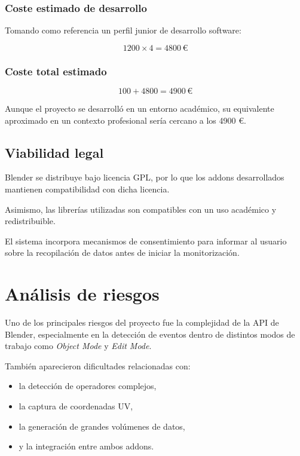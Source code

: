 \subsubsection{Coste estimado de desarrollo}

Tomando como referencia un perfil junior de desarrollo software:

\[
1200 \times 4 = 4800 \,€
\]

\subsubsection{Coste total estimado}

\[
100 + 4800 = 4900 \,€
\]

Aunque el proyecto se desarrolló en un entorno académico, su equivalente aproximado en un contexto profesional sería cercano a los 4900 €.

\subsection{Viabilidad legal}

Blender se distribuye bajo licencia GPL, por lo que los addons desarrollados mantienen compatibilidad con dicha licencia.

Asimismo, las librerías utilizadas son compatibles con un uso académico y redistribuible.

El sistema incorpora mecanismos de consentimiento para informar al usuario sobre la recopilación de datos antes de iniciar la monitorización.

\section{Análisis de riesgos}

Uno de los principales riesgos del proyecto fue la complejidad de la API de Blender, especialmente en la detección de eventos dentro de distintos modos de trabajo como \textit{Object Mode} y \textit{Edit Mode}.

También aparecieron dificultades relacionadas con:

\begin{itemize}
    \item la detección de operadores complejos,
    \item la captura de coordenadas UV,
    \item la generación de grandes volúmenes de datos,
    \item y la integración entre ambos addons.
\end{itemize}


